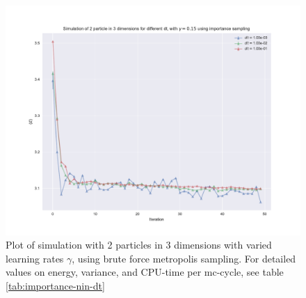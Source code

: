 \begin{figure}[h]
\hspace{-2.8cm}
\includegraphics[width = \paperwidth]{figures/importance_2p_3d_dt.pdf}
\caption{Plot of simulation with 2 particles in 3 dimensions with varied learning rates $\gamma$, using brute force metropolis sampling.
			For detailed values on energy, variance, and CPU-time per mc-cycle, see table \ref{tab:importance-nin-dt}}
\label{fig:importance-nin-dt}
\end{figure}
